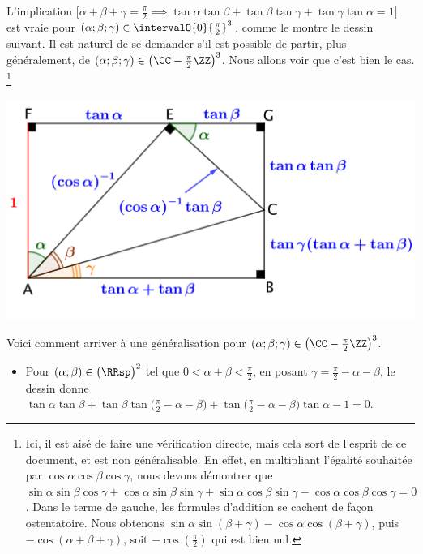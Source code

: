 

\begin{example}
    L'implication
    $\big[
        \alpha + \beta + \gamma = \frac{\pi}{2}
        \implies
          \tan \alpha \tan \beta
        + \tan \beta  \tan \gamma
        + \tan \gamma \tan \alpha
        = 1
    \big]$
    est vraie pour 
    $(\alpha ; \beta ; \gamma) \in \intervalO{0}{\frac{\pi}{2}}^3$,
    comme le montre le dessin suivant.
    Il est naturel de se demander s'il est possible de partir, plus généralement, de
    $(\alpha ; \beta ; \gamma) \in \big( \CC - \frac{\pi}{2} \ZZ \big)^3$.
    Nous allons voir que c'est bien le cas.
    \footnote{
    	Ici, il est aisé de faire une vérification directe, mais cela sort de l'esprit de ce document, et est non généralisable.
		En effet,
		en multipliant l'égalité souhaitée par $\cos \alpha \cos \beta \cos \gamma$, nous devons démontrer que
		$ \sin \alpha \sin \beta \cos \gamma
        + \cos \alpha \sin \beta \sin \gamma
        + \sin \alpha \cos \beta \sin \gamma
        - \cos \alpha \cos \beta \cos \gamma
        = 0$.
        Dans le terme de gauche, les formules d'addition se cachent de façon ostentatoire.
        Nous obtenons
		$ \sin \alpha \sin(\beta + \gamma)
        - \cos \alpha \cos(\beta + \gamma)$,
        puis
		$ - \cos (\alpha + \beta + \gamma)$,
        soit
		$- \cos (\frac{\pi}{2})$
		qui est bien nul.
    }
    
    \begin{center}
    	\includegraphics[scale=.75]{sum-tan-prod.png}
    \end{center}
    
    
    Voici comment arriver à une généralisation pour
    $(\alpha ; \beta ; \gamma) \in \big( \CC - \frac{\pi}{2} \ZZ \big)^3$.
    \begin{itemize}
    	\item Pour $(\alpha ; \beta) \in \big( \RRsp \big)^2$ tel que $0 < \alpha + \beta < \frac{\pi}{2}$,
		en posant $\gamma = \frac{\pi}{2} - \alpha - \beta$,
		le dessin donne
        $
            \tan \alpha \tan \beta
            + \tan \beta  \tan \big( \frac{\pi}{2} - \alpha - \beta \big)
            + \tan \big( \frac{\pi}{2} - \alpha - \beta \big) \tan \alpha
            - 1
            = 0
        $.
        


\end{itemize}
\end{example}
